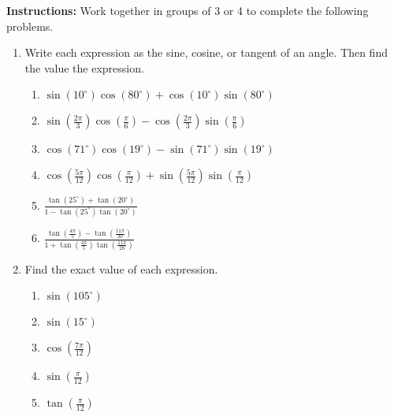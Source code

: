 

\noindent \textbf{Instructions:}  Work together in groups of  3 or 4 to complete the following problems.\\

\begin{enumerate}



\item Write each expression as the sine, cosine, or tangent of an angle.  Then find the value the expression.
\begin{enumerate}
\item $\sin(10^\circ)\cos(80^\circ)+\cos(10^\circ)\sin(80^\circ)$
\vfill
\item $\displaystyle\sin\left(\frac{2\pi}{3}\right)\cos\left(\frac{\pi}{6}\right)-\cos\left(\frac{2\pi}{3}\right)\sin\left(\frac{\pi}{6}\right)$
\vfill
\item $\cos(71^\circ)\cos(19^\circ)-\sin(71^\circ)\sin(19^\circ)$
\vfill
\item $\displaystyle\cos\left(\frac{5\pi}{12}\right)\cos\left(\frac{\pi}{12}\right)+\sin\left(\frac{5\pi}{12}\right)\sin\left(\frac{\pi}{12}\right)$
\vfill
\newpage
\item $\displaystyle \frac{\tan(25^\circ)+\tan(20^\circ)}{1-\tan(25^\circ)\tan(20^\circ)}$
\vfill
\item $\displaystyle \frac{\tan\left(\frac{4\pi}{5}\right)-\tan\left(\frac{11\pi}{20}\right)}{1+\tan\left(\frac{4\pi}{5}\right)\tan\left(\frac{11\pi}{20}\right)}$
\vfill
\end{enumerate}


\item Find the exact value of each expression.

\begin{enumerate}

\item $\sin(105^\circ)$
\vfill
\item $\sin(15^\circ)$
\vfill

\newpage

\item $\displaystyle\cos\left(\frac{7\pi}{12}\right)$

\vfill
\item $\displaystyle \sin\left(\frac{\pi}{12}\right)$

\vfill


\item $\displaystyle \tan\left(\frac{\pi}{12}\right)$
\vfill



\end{enumerate}
\end{enumerate}
